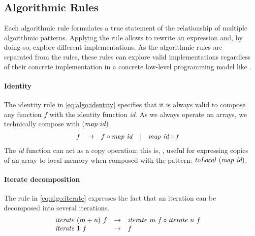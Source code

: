 \newenvironment{rerule}[1]%
{\begin{equation}\begin{array}{#1}\ignorespaces}%
{\end{array}\end{equation}%
\ignorespacesafterend}

\newenvironment{rerule*}[1]%
{\begin{equation*}\begin{array}{#1}\ignorespaces}%
{\end{array}\end{equation*}%
\ignorespacesafterend}



\subsection{Algorithmic Rules}
\label{section:rules:algo}

Each algorithmic rule formulates a true statement of the relationship of multiple algorithmic patterns.
Applying the rule allows to rewrite an expression and, by doing so, explore different implementations.
As the algorithmic rules are separated from the  \OpenCL rules, these rules can explore valid implementations regardless of their concrete implementation in a concrete low-level programming model like \OpenCL.

\paragraph{Identity}
The identity rule in \autoref{eq:algo:identity} specifies that it is always valid to compose any function $f$ with the identity function \emph{id}.
As we always operate on arrays, we technically compose with $(\map\ id)$.
%
\begin{rerule}{lclcl}
  f & \rightarrow & f \circ \map\ \textit{id} & | & \map\ \textit{id} \circ f
  \label{eq:algo:identity}
\end{rerule}
%
The \textit{id} function can act as a copy operation; this is, \eg, useful for expressing copies of an array to local memory when composed with the \toLocal \OpenCL pattern: $\text{\textit{toLocal}}\ (\text{\textit{map}}\ \textit{id})$.

 
\paragraph{Iterate decomposition}
The rule in \autoref{eq:algo:iterate} expresses the fact that an iteration can be decomposed into several iterations.
%
\begin{rerule}{lcl}
  \iterateN\ (m+n)\ f
    & \rightarrow &
      \iterateN\ m\ f
        \circ \iterateN\ n\ f\\
  \iterateN\ 1\ f & \rightarrow & f
  \label{eq:algo:iterate}
\end{rerule}

